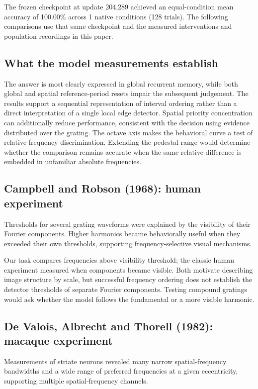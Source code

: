 \documentclass[11pt]{article}
\begin{document}
The frozen checkpoint at update 204,289 achieved an equal-condition mean accuracy of 100.00\% across 1 native conditions (128 trials). The following comparisons use that same checkpoint and the measured interventions and population recordings in this paper.

\subsection{What the model measurements establish}
The answer is most clearly expressed in global recurrent memory, while both global and spatial reference-period resets impair the subsequent judgement. The results support a sequential representation of interval ordering rather than a direct interpretation of a single local edge detector. Spatial priority concentration can additionally reduce performance, consistent with the decision using evidence distributed over the grating. The octave axis makes the behavioral curve a test of relative frequency discrimination. Extending the pedestal range would determine whether the comparison remains accurate when the same relative difference is embedded in unfamiliar absolute frequencies.

\subsection{Campbell and Robson (1968): human experiment}
Thresholds for several grating waveforms were explained by the visibility of their Fourier components. Higher harmonics became behaviorally useful when they exceeded their own thresholds, supporting frequency-selective visual mechanisms. \cite{bio_campbell}

Our task compares frequencies above visibility threshold; the classic human experiment measured when components became visible. Both motivate describing image structure by scale, but successful frequency ordering does not establish the detector thresholds of separate Fourier components. Testing compound gratings would ask whether the model follows the fundamental or a more visible harmonic.

\subsection{De Valois, Albrecht and Thorell (1982): macaque experiment}
Measurements of striate neurons revealed many narrow spatial-frequency bandwidths and a wide range of preferred frequencies at a given eccentricity, supporting multiple spatial-frequency channels. \cite{bio_devalois_f}
\end{document}
